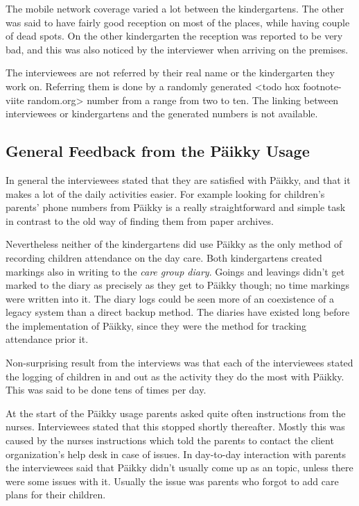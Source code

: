 The mobile network coverage varied a lot between the kindergartens. The other was said to  have fairly good reception on most of the places, while having couple of dead spots. On the other kindergarten the reception was reported to be very bad, and this was also noticed by the interviewer when arriving on the premises. 

The interviewees are not referred by their real name or the kindergarten they work on. Referring them is done by a randomly generated <todo hox footnote-viite random.org> number from a range from two to ten. The linking between interviewees or kindergartens and the generated numbers is not available.



\subsection{General Feedback from the Päikky Usage}

In general the interviewees stated that they are satisfied with Päikky, and that it makes a lot of the daily activities easier. For example looking for children's parents' phone numbers from Päikky is a really straightforward and simple task in contrast to the old way of finding them from paper archives. 

Nevertheless neither of the kindergartens did use Päikky as the only method of recording children attendance on the day care. Both kindergartens created markings also in writing to the \textit{care group diary}. Goings and leavings didn't get marked to the diary as precisely as they get to Päikky though; no time markings were written into it. The diary logs could be seen more of an coexistence of a legacy system than a direct backup method. The diaries have existed long before the implementation of Päikky, since they were the method for tracking attendance prior it. 

Non-surprising result from the interviews was that each of the interviewees stated the logging of children in and out as the activity they do the most with Päikky. This was said to be done tens of times per day.

At the start of the Päikky usage parents asked quite often instructions from the nurses. Interviewees stated that this stopped shortly thereafter. Mostly this was caused by the nurses instructions which told the parents to contact the client organization's help desk in case of issues. In day-to-day interaction with parents the interviewees said that Päikky didn't usually come up as an topic, unless there were some issues with it. Usually the issue was parents who forgot to add care plans for their children.


